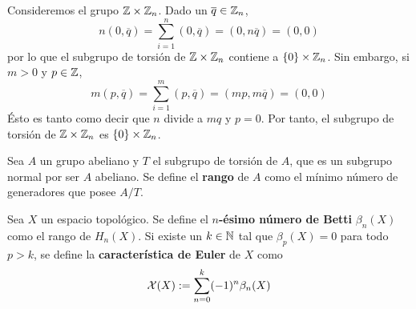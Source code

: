 \begin{example}
Consideremos el grupo $\mathbb{Z}\times \mathbb{Z}_n$. Dado un $\overline{q} \in \mathbb{Z}_n$,
\[n(0,\overline{q})=\sum^n_{i=1}(0,\overline{q})=(0,n\overline{q})=(0,0)\]
por lo que el subgrupo de torsión de $\mathbb{Z}\times \mathbb{Z}_n$ contiene a
$\{0\}\times\mathbb{Z}_n$. Sin embargo, si $m > 0$ y $p \in \mathbb{Z}$,
\[m(p,\overline{q})=\sum^m_{i=1}(p,\overline{q})=(mp,m\overline{q})=(0,0)\]
Ésto es tanto como decir que $n$ divide a $mq$ y $p=0$. Por tanto, el subgrupo
de torsión de $\mathbb{Z}\times \mathbb{Z}_n$ es $\{0\}\times\mathbb{Z}_n$.
\end{example}

Sea $A$ un grupo abeliano y $T$ el subgrupo de torsión de $A$, que es un
subgrupo normal por ser $A$ abeliano. Se define el \textbf{rango} de $A$ como el
mínimo número de generadores que posee $A/T$.

\begin{definition}
Sea $X$ un espacio topológico. Se define el \textbf{$n$-ésimo número de Betti}
$\beta_n(X)$ como el rango de $H_n(X)$. Si existe un $k \in \mathbb{N}$ tal que
$\beta_p(X)=0$ para todo $p > k$, se define la \textbf{característica de Euler}
de $X$ como 
\[\mathcal{X}(X):=\sum^k_{n=0}(-1)^n\beta_n(X)\]
\end{definition}
